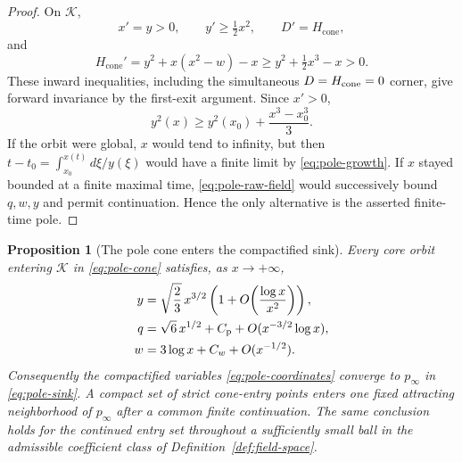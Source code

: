 \documentclass[11pt]{amsart}
\numberwithin{equation}{section}
\newtheorem{proposition}[theorem]{Proposition}
\theoremstyle{definition}
\theoremstyle{remark}
\begin{document}
\begin{proof}
On $\mathcal K$,
\begin{equation}\label{eq:pole-cone-derivatives}
 x'=y>0,\qquad y'\ge\tfrac12x^2,
 \qquad D'=H_{\mathrm{cone}},
\end{equation}
and
\begin{equation}\label{eq:pole-cone-H-derivative}
 H_{\mathrm{cone}}'
 =y^2+x(x^2-w)-x
 \ge y^2+\tfrac12x^3-x>0.
\end{equation}
These inward inequalities, including the simultaneous $D=H_{\rm cone}=0$
corner, give forward invariance by the first-exit argument.  Since $x'>0$,
\begin{equation}\label{eq:pole-growth}
 y^2(x)\ge y^2(x_0)+\frac{x^3-x_0^3}{3}.
\end{equation}
If the orbit were global, $x$ would tend to infinity, but then
$t-t_0=\int_{x_0}^{x(t)}d\xi/y(\xi)$ would have a finite limit by
\eqref{eq:pole-growth}.  If $x$ stayed bounded at a finite maximal time,
\eqref{eq:pole-raw-field} would successively bound $q,w,y$ and permit
continuation.  Hence the only alternative is the asserted finite-time
pole.
\end{proof}

\begin{proposition}[The pole cone enters the compactified sink]
\label{prop:pole-cone-to-sink}
Every core orbit entering $\mathcal K$ in \eqref{eq:pole-cone} satisfies,
as $x\to+\infty$,
\begin{align}
 y&=\sqrt{\frac23}\,x^{3/2}
      \left(1+O\!\left(\frac{\log x}{x^2}\right)\right),
      \notag\\
 q&=\sqrt6\,x^{1/2}+C_{\mathrm p}+O(x^{-3/2}\log x),
      \label{eq:pole-cone-asymptotics}\\
 w&=3\log x+C_w+O(x^{-1/2}).\notag
\end{align}
Consequently the compactified variables \eqref{eq:pole-coordinates}
converge to $p_\infty$ in \eqref{eq:pole-sink}.  A compact set of strict
cone-entry points enters one fixed attracting neighborhood of $p_\infty$
after a common finite continuation.  The same conclusion holds for the
continued entry set throughout a sufficiently small ball in the
admissible coefficient class of Definition~\ref{def:field-space}.
\end{proposition}
\end{document}
